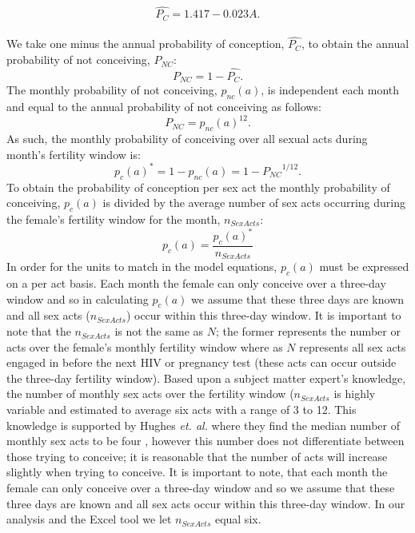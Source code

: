 \documentclass[11pt]{nih_mod}
\begin{document}
\begin{equation}
	\hat{P_C}= 1.417 - 0.023A.
\end{equation}
\\We take one minus the annual probability of conception, $\hat{P_C}$, to obtain the annual probability of not conceiving, $P_{NC}$: 
\begin{equation}
	P_{NC} =  1 - \hat{P_C} .
\end{equation}
The monthly probability of not conceiving, $p_{nc}(a)$,  is independent each month and equal to the annual probability of not conceiving as follows:
\begin{equation}
	P_{NC} =  p_{nc}(a)^{12} .
\end{equation}
As such, the monthly probability of conceiving over all sexual acts during month's fertility window is:
\begin{equation}
	p_c(a)^* = 1 - p_{nc}(a) = 1 - {P_{NC}}^{1/12} . 
\end{equation}
To obtain the probability of conception per sex act the monthly probability of conceiving, $p_c(a)$ is divided by the average number of sex acts occurring during the female's fertility window for the month, $n_{SexActs}$:  
\begin{equation}
	p_c(a) = \frac{p_c(a)^*}{n_{SexActs}}
\end{equation}
In order for the units to match in the model equations, $p_c(a)$ must be expressed on a per act basis.  Each month the female can only conceive over a three-day window and so in calculating $p_c(a)$ we assume that these three days are known and all sex acts ($n_{SexActs}$) occur within this three-day window. It is important to note that the $n_{SexActs}$ is not the same as $N$; the former represents the number or acts over the female's monthly fertility window where as $N$ represents all sex acts engaged in before the next HIV or pregnancy test (these acts can occur outside the three-day fertility window). Based upon a subject matter expert's knowledge, the number of monthly sex acts over the fertility window ($n_{SexActs}$ is highly variable and estimated to average six acts with a range of 3 to 12.  This knowledge is supported by Hughes {\it et. al.} where they find the median number of monthly sex acts to be four \cite{Hughes2012}, however this number does not differentiate between those trying to conceive; it is reasonable that the number of acts will increase slightly when trying to conceive. It is important to note, that each month the female can only conceive over a three-day window and so we assume that these three days are known and all sex acts occur within this three-day window.  In our analysis and the Excel tool we let $n_{SexActs}$ equal six.
\end{document}
